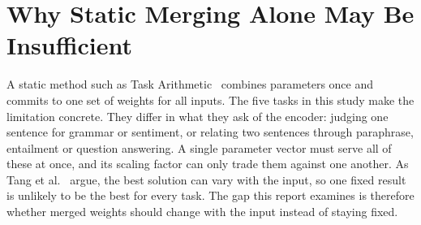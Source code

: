 \section{Why Static Merging Alone May Be Insufficient}

A static method such as Task Arithmetic~\cite{ilharco2023task} combines parameters once and commits to one set of weights for all inputs. The five tasks in this study make the limitation concrete. They differ in what they ask of the encoder: judging one sentence for grammar or sentiment, or relating two sentences through paraphrase, entailment or question answering. A single parameter vector must serve all of these at once, and its scaling factor can only trade them against one another. As Tang et al.~\cite{tang2024wemoe} argue, the best solution can vary with the input, so one fixed result is unlikely to be the best for every task. The gap this report examines is therefore whether merged weights should change with the input instead of staying fixed.
